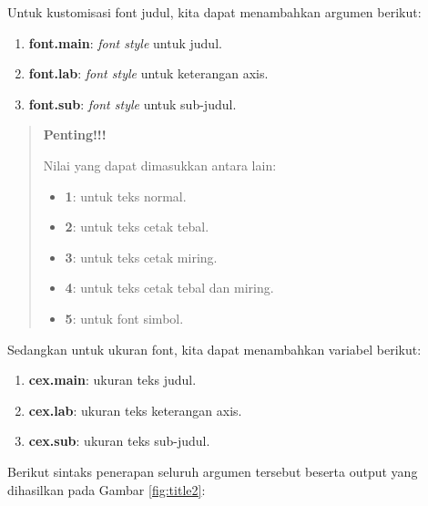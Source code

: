 \documentclass[]{book}
\providecommand{\tightlist}{%
  \setlength{\itemsep}{0pt}\setlength{\parskip}{0pt}}
\theoremstyle{definition}
\theoremstyle{definition}
\theoremstyle{definition}
\theoremstyle{remark}
\begin{document}
Untuk kustomisasi font judul, kita dapat menambahkan argumen berikut:

\begin{enumerate}
\def\labelenumi{\alph{enumi}.}
\tightlist
\item
  \textbf{font.main}: \emph{font style} untuk judul.
\item
  \textbf{font.lab}: \emph{font style} untuk keterangan axis.
\item
  \textbf{font.sub}: \emph{font style} untuk sub-judul.
\end{enumerate}

\begin{quote}
\textbf{Penting!!!}

Nilai yang dapat dimasukkan antara lain:

\begin{itemize}
\tightlist
\item
  \textbf{1}: untuk teks normal.
\item
  \textbf{2}: untuk teks cetak tebal.
\item
  \textbf{3}: untuk teks cetak miring.
\item
  \textbf{4}: untuk teks cetak tebal dan miring.
\item
  \textbf{5}: untuk font simbol.
\end{itemize}
\end{quote}

Sedangkan untuk ukuran font, kita dapat menambahkan variabel berikut:

\begin{enumerate}
\def\labelenumi{\alph{enumi}.}
\tightlist
\item
  \textbf{cex.main}: ukuran teks judul.
\item
  \textbf{cex.lab}: ukuran teks keterangan axis.
\item
  \textbf{cex.sub}: ukuran teks sub-judul.
\end{enumerate}

Berikut sintaks penerapan seluruh argumen tersebut beserta output yang dihasilkan pada Gambar \ref{fig:title2}:
\end{document}
